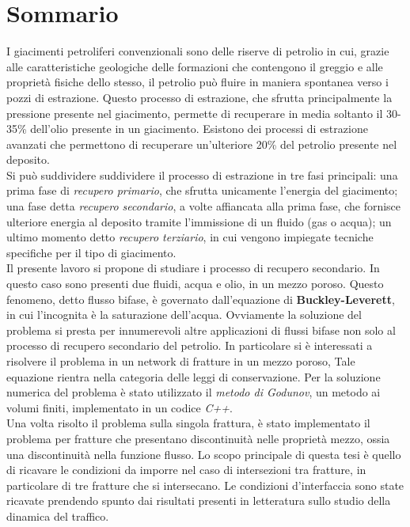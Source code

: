 \chapter*{Sommario}
\vspace{-5mm}
\lfoot[\fancyplain{}{\bf \thepage}]{}
\cfoot{}
\rfoot[]{\fancyplain{}{\bf \thepage}}

I giacimenti petroliferi convenzionali sono delle riserve di petrolio in cui, grazie alle caratteristiche geologiche delle formazioni che contengono il greggio e alle proprietà fisiche dello stesso, il petrolio può fluire in maniera spontanea verso i pozzi di estrazione. Questo processo di estrazione, che sfrutta principalmente la pressione presente nel giacimento, permette di recuperare in media soltanto il 30-35\% dell'olio presente in un giacimento. Esistono dei processi di estrazione avanzati che permettono di recuperare un'ulteriore 20\% del petrolio presente nel deposito. \\
Si può suddividere suddividere il processo di estrazione in tre fasi principali: una prima fase di \textit{recupero primario}, che sfrutta unicamente l'energia del giacimento; una fase detta \textit{recupero secondario}, a volte affiancata alla prima fase, che fornisce ulteriore energia al deposito tramite l'immissione di un fluido (gas o acqua); un ultimo momento detto \textit{recupero terziario}, in cui vengono impiegate tecniche specifiche per il tipo di giacimento.\\
Il presente lavoro si propone di studiare i processo di recupero secondario. In questo caso sono presenti due fluidi, acqua e olio, in un mezzo poroso. Questo fenomeno, detto flusso bifase, è governato dall'equazione di \textbf{Buckley-Leverett}, in cui l'incognita è la saturazione dell'acqua. Ovviamente la soluzione del problema si presta per innumerevoli altre applicazioni di flussi bifase non solo al processo di recupero secondario del petrolio. In particolare si è interessati a risolvere il problema in un network di fratture in un mezzo poroso, Tale equazione rientra nella categoria delle leggi di conservazione. Per la soluzione numerica del problema è stato utilizzato il \textit{metodo di Godunov}, un metodo ai volumi finiti, implementato in un codice \textit{C++}. \\
Una volta risolto il problema sulla singola frattura, è stato implementato il problema per fratture che presentano discontinuità nelle proprietà mezzo, ossia una discontinuità nella funzione flusso. Lo scopo principale di questa tesi è quello di ricavare le condizioni da imporre nel caso di intersezioni tra fratture, in particolare di tre fratture che si intersecano. Le condizioni d'interfaccia sono state ricavate prendendo spunto dai risultati presenti in letteratura sullo studio della dinamica del traffico.\\


